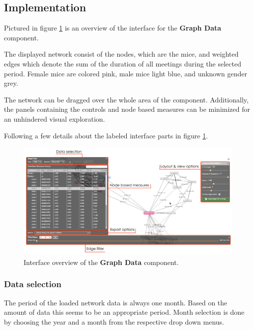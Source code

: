 \clearpage

\subsection{Implementation}
\label{subsec:graph_explore}

Pictured in figure \ref{fig:graph_data_interface_overview} is an overview of the interface for the \textbf{Graph Data} component. 

The displayed network consist of the nodes, which are the mice, and weighted edges which denote the sum of the duration of all meetings during the selected period. Female mice are colored pink, male mice light blue, and unknown gender grey. 

The network can be dragged over the whole area of the component. Additionally, the panels containing the controls and node based measures can be minimized for an unhindered visual exploration.

Following a few details about the labeled interface parts in figure \ref{fig:graph_data_interface_overview}.

\begin{figure}[htbp]
\begin{center}
  \includegraphics[width=\textwidth]{assets/pdf/graph_data_interface_overview.pdf}
  \caption[Graph Data interface overview]{Interface overview of the \textbf{Graph Data} component.}
  \label{fig:graph_data_interface_overview}
\end{center}
\end{figure}

\subsubsection*{Data selection}
The period of the loaded network data is always one month. Based on the amount of data this seems to be an appropriate period. Month selection is done by choosing the year and a month from the respective drop down menus.    

